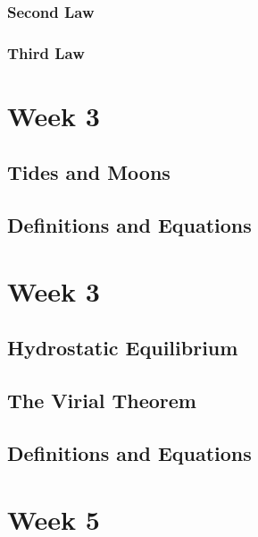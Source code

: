 \documentclass[a4paper,10pt]{article}
\begin{document}
\subsubsection{Second Law}
\subsubsection{Third Law}


\newpage
\section{Week 3}

\subsection{Tides and Moons}

\subsection{Definitions and Equations}


\newpage
\section{Week 3}

\subsection{Hydrostatic Equilibrium}

\subsection{The Virial Theorem}

\subsection{Definitions and Equations}



\newpage
\section{Week 5}
\end{document}
